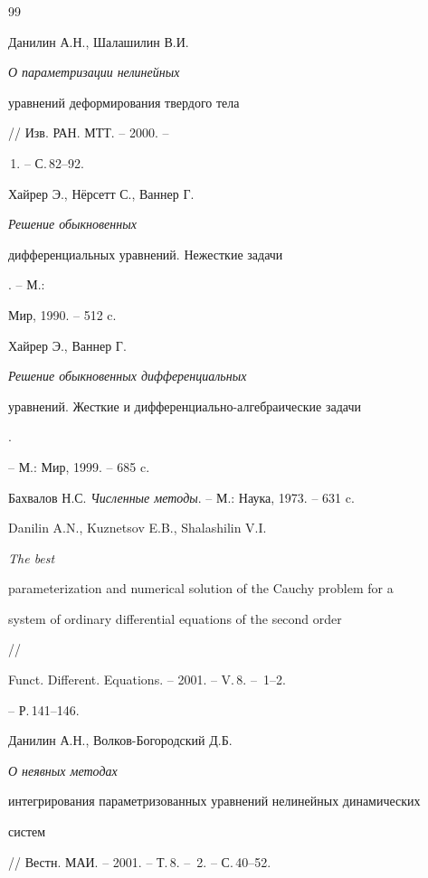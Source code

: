 \begin{thebibliography}{99}


Данилин А.Н., Шалашилин В.И. {\em О параметризации нелинейных 


уравнений деформирования твердого тела} // Изв. РАН. МТТ. -- 2000. -- 


\No\,1. -- С.\,82--92. 




Хайрер Э., Н\"ерсетт С., Ваннер Г. {\em Решение обыкновенных 


дифференциальных уравнений. Нежесткие задачи}. -- М.: 


Мир, 1990. -- 512 c. 




Хайрер Э., Ваннер Г. {\em Решение обыкновенных дифференциальных 


уравнений. Жесткие и дифференциально-алгебраические задачи}.


-- М.: Мир, 1999. -- 685 c. 




Бахвалов Н.С. {\em Численные методы}. -- М.: Наука, 1973. -- 631 c. 




Danilin A.N., Kuznetsov E.B., Shalashilin V.I. {\em The best 


parameterization and numerical solution of the Cauchy problem for a 


system of ordinary differential equations of the second order} // 


Funct. Different. Equations. -- 2001. -- V.\,8. -- \No\,1--2.


-- Р.\,141--146. 




Данилин А.Н., Волков-Богородский Д.Б. {\em О неявных методах 


интегрирования параметризованных уравнений нелинейных динамических 


систем} // Вестн. МАИ. -- 2001. -- Т.\,8. -- \No\,2. -- С.\,40--52. 


 


\end{thebibliography} 


 


\vskip 2cm 


 






 


\label{end} 


 


